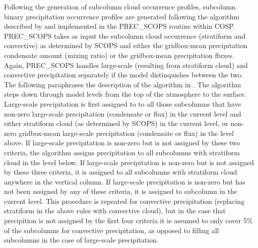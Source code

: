 Following the generation of subcolumn cloud occurrence profiles,
subcolumn binary precipitation occurrence profiles are generated
following the algorithm described by \citet{zhang_et_al_2010} and
implemented in the PREC\_SCOPS routine within COSP. PREC\_SCOPS takes as
input the subcolumn cloud occurrence (stratiform and convective) as
determined by SCOPS and either the gridbox-mean precipitation condensate
amount (mixing ratio) or the gridbox-mean precipitation fluxes. Again,
PREC\_SCOPS handles large-scale (resulting from stratiform cloud) and
convective precipitation separately if the model distinquishes between
the two. The following paraphrases the description of the algorithm in
\citet{zhang_et_al_2010}. The algorithm steps down through model levels
from the top of the atmosphere to the surface. Large-scale precipitation
is first assigned to to all those subcolumns that have non-zero
large-scale precipitation (condensate or flux) in the current level and
either stratiform cloud (as determined by SCOPS) in the current level,
or non-zero gridbox-mean large-scale precipitation (condensate or flux)
in the level above. If large-scale precipitation is non-zero but is not
assigned by these two criteria, the algorithm assigns precipitation to
all subcolumns with stratiform cloud in the level below. If large-scale
precipitation is non-zero but is not assigned by these three criteria,
it is assigned to all subcolumns with stratiform cloud anywhere in the
vertical column. If large-scale precipitation is non-zero but has not
been assigned by any of these criteria, it is assigned to subcolumn in
the current level. This procedure is repeated for convective
precipitation (replacing stratiform in the above rules with convective
cloud), but in the case that precipition is not assigned by the first
four criteria it is assumed to only cover 5\% of the subcolumns for
convective precipitation, as opposed to filling all subcolumns in the
case of large-scale precipitation.

